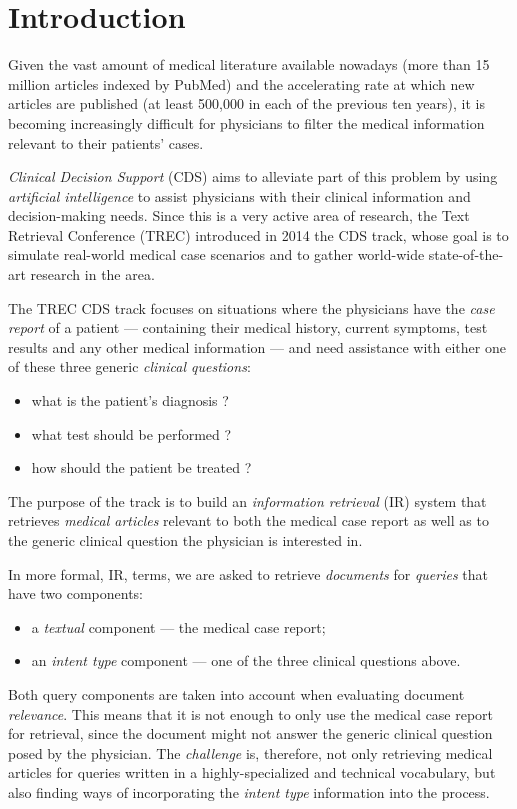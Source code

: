 \chapter{Introduction}
Given the vast amount of medical literature available nowadays (more than 15 million articles indexed by PubMed)
and the accelerating rate at which new articles are published (at least 500,000 in each of the previous ten years),
it is becoming increasingly difficult for physicians to filter the medical information
relevant to their patients' cases.

\emph{Clinical Decision Support} (CDS) aims to alleviate part of this problem by using \emph{artificial intelligence}
to assist physicians with their clinical information and decision-making needs.
Since this is a very active area of research,
the Text Retrieval Conference (TREC)
introduced in 2014 the CDS track,
whose goal is to simulate real-world medical case scenarios and to gather world-wide state-of-the-art research in the area.

The TREC CDS track focuses on situations where the physicians have the \emph{case report} of a patient
--- containing their medical history, current symptoms, test results and any other medical information ---
and need assistance with either one of these three generic
\emph{clinical questions}:
\begin{itemize}[noitemsep,nolistsep]
 \item what is the patient's diagnosis ?
 \item what test should be performed ?
 \item how should the patient be treated ?\end{itemize}

The purpose of the track is to build an \emph{information retrieval} (IR) system that
retrieves \emph{medical articles} relevant to both the medical
case report as well as to the generic clinical question the physician is interested in.

In more formal, IR, terms, we are asked to retrieve \emph{documents} for \emph{queries} that have two components:
\begin{itemize}[noitemsep, nolistsep]
 \item a \emph{textual} component --- the medical case report;
 \item an \emph{intent type} component --- one of the three clinical questions above.
\end{itemize}

Both query components are taken into account when evaluating document \emph{relevance}.
This means that it is not enough to only use the medical case report
for retrieval, since the document might not answer the generic clinical question posed by the physician.
The \emph{challenge} is, therefore, not only retrieving medical articles for queries written in a highly-specialized and technical
vocabulary, but also finding ways of incorporating the \emph{intent type} information into the process.

